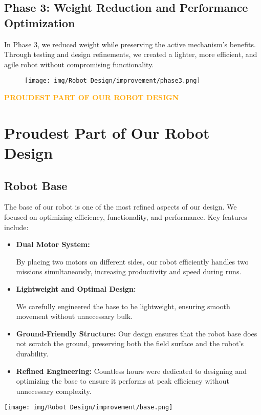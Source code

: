 \subsection*{Phase 3: Weight Reduction and Performance Optimization}

In Phase 3, we reduced weight while preserving the active mechanism's benefits. Through testing and design refinements, we created a lighter, more efficient, and agile robot without compromising functionality.
\begin{figure}[h!]
    \centering
        \texttt{[image: img/Robot Design/improvement/phase3.png]}
        
    \end{figure}




\newpage
\begin{center}
    \huge \textbf{\textcolor{orange}{PROUDEST PART OF OUR ROBOT DESIGN}} \\[0.5cm]
\end{center}
\section{Proudest Part of Our Robot Design}
\subsection{Robot Base}
\begin{minipage}{0.6\textwidth}
    The base of our robot is one of the most refined aspects of our design. We focused on optimizing efficiency, functionality, and performance. Key features include:

    \begin{itemize}
        \item \textbf{Dual Motor System:} 
        
        By placing two motors on different sides, our robot efficiently handles two missions simultaneously, increasing productivity and speed during runs.
        
        \item \textbf{Lightweight and Optimal Design:}
        
        We carefully engineered the base to be lightweight, ensuring smooth movement without unnecessary bulk.
        \item \textbf{Ground-Friendly Structure:} Our design ensures that the robot base does not scratch the ground, preserving both the field surface and the robot’s durability.
        \item \textbf{Refined Engineering:} Countless hours were dedicated to designing and optimizing the base to ensure it performs at peak efficiency without unnecessary complexity.
    \end{itemize}
\end{minipage}%
\hfill
\begin{minipage}{0.35\textwidth}
    \centering
    \texttt{[image: img/Robot Design/improvement/base.png]}
\end{minipage}



